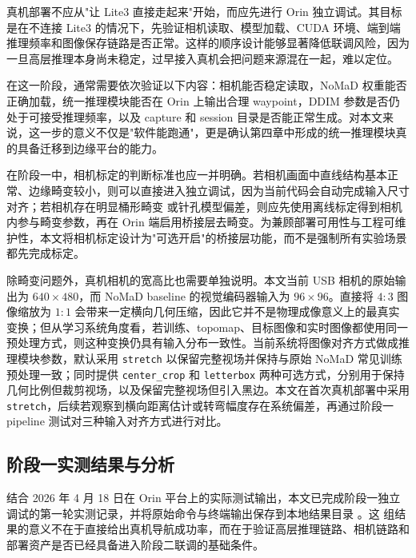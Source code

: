 真机部署不应从"让 Lite3 直接走起来"开始，而应先进行 Orin 独立调试。其目标是在不连接 Lite3 的情况下，先验证相机读取、模型加载、CUDA
环境、端到端推理频率和图像保存链路是否正常。这样的顺序设计能够显著降低联调风险，因为一旦高层推理本身尚未稳定，过早接入真机会把问题来源混在一起，难以定位。

在这一阶段，通常需要依次验证以下内容：相机能否稳定读取，NoMaD 权重能否正确加载，统一推理模块能否在 Orin 上输出合理 waypoint，DDIM
参数是否仍处于可接受推理频率，以及 capture 和 session
目录是否能正常生成。对本文来说，这一步的意义不仅是"软件能跑通"，更是确认第四章中形成的统一推理模块真的具备迁移到边缘平台的能力。

在阶段一中，相机标定的判断标准也应一并明确。若相机画面中直线结构基本正常、边缘畸变较小，则可以直接进入独立调试，因为当前代码会自动完成输入尺寸对齐；若相机存在明显桶形畸变
或针孔模型偏差，则应先使用离线标定得到相机内参与畸变参数，再在 Orin
端启用桥接层去畸变。为兼顾部署可用性与工程可维护性，本文将相机标定设计为"可选开启"的桥接层功能，而不是强制所有实验场景都先完成标定。

除畸变问题外，真机相机的宽高比也需要单独说明。本文当前 USB 相机的原始输出为 $640\times480$，而 NoMaD baseline 的视觉编码器输入为 $96\times96$。直接将 $4:3$ 图像缩放为 $1:1$ 会带来一定横向几何压缩，因此它并不是物理成像意义上的最真实变换；但从学习系统角度看，若训练、topomap、目标图像和实时图像都使用同一预处理方式，则这种变换仍具有输入分布一致性。当前系统将图像对齐方式做成推理模块参数，默认采用 \texttt{stretch} 以保留完整视场并保持与原始 NoMaD 常见训练预处理一致；同时提供 \texttt{center\_crop} 和 \texttt{letterbox} 两种可选方式，分别用于保持几何比例但裁剪视场，以及保留完整视场但引入黑边。本文在首次真机部署中采用 \texttt{stretch}，后续若观察到横向距离估计或转弯幅度存在系统偏差，再通过阶段一 pipeline 测试对三种输入对齐方式进行对比。

\subsection{阶段一实测结果与分析}

结合 2026 年 4 月 18 日在 Orin 平台上的实际测试输出，本文已完成阶段一独立调试的第一轮实测记录，并将原始命令与终端输出保存到本地结果目录 。这
组结果的意义不在于直接给出真机导航成功率，而在于验证高层推理链路、相机链路和部署资产是否已经具备进入阶段二联调的基础条件。

